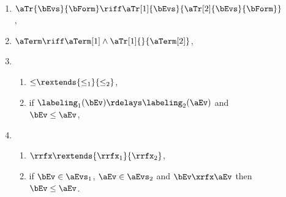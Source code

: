 \begin{figure}
\begin{multicols}{2}
\begin{enumerate}[topsep=0pt,label=(\textsc{s}\arabic*),ref=\textsc{s}\arabic*]
\begin{enumerate}[leftmargin=0pt]
      \end{enumerate}
    \item \label{seq-tau}
      $\aTr{\bEvs}{\bForm} \riff \aTr[1]{\bEvs}{\aTr[2]{\bEvs}{\bForm}}$,
    \item \label{seq-term}
      $\aTerm \riff \aTerm[1]\land\aTr[1]{}{\aTerm[2]}$,
    \item[] 
      \begin{enumerate}[leftmargin=0pt]
      \item \label{seq-le-extends}
        ${\le}\rextends{\le_1}{\le_2}$, 
      \item \label{seq-le-delays}
        if $\labeling_1(\bEv) \rdelays \labeling_2(\aEv)$ and
        $\bEv\le\aEv$,
      \end{enumerate}
    \item[] 
      \begin{enumerate}[leftmargin=0pt]
      \item \label{seq-rf-extends}
        ${\rrfx}\rextends{\rrfx_1}{\rrfx_2}$,
      \item \label{seq-rf-le}
        if $\bEv\in\aEvs_1$, $\aEv\in\aEvs_2$ and $\bEv\xrfx\aEv$ then $\bEv\le\aEv$.
      \end{enumerate}
    \end{enumerate}
  \end{multicols}
  \medskip


\end{figure}
